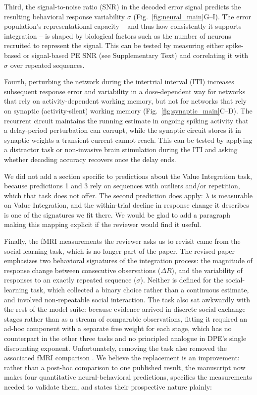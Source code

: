 \begin{ms}
Third, the signal-to-noise ratio (SNR) in the decoded error signal predicts the resulting behavioral response variability $\sigma$ (Fig.~\ref{fig:neural_main}G--I). The error population's representational capacity -- and thus how consistently it supports integration -- is shaped by biological factors such as the number of neurons recruited to represent the signal. This can be tested by measuring either spike-based or signal-based PE SNR (see Supplementary Text) and correlating it with $\sigma$ over repeated sequences.

Fourth, perturbing the network during the intertrial interval (ITI) increases subsequent response error and variability in a dose-dependent way for networks that rely on activity-dependent working memory, but not for networks that rely on synaptic (activity-silent) working memory (Fig.~\ref{fig:synaptic_main}C--D). The recurrent circuit maintains the running estimate in ongoing spiking activity that a delay-period perturbation can corrupt, while the synaptic circuit stores it in synaptic weights a transient current cannot reach. This can be tested by applying a distractor task or non-invasive brain stimulation during the ITI and asking whether decoding accuracy recovers once the delay ends.
\end{ms}

We did not add a section specific to predictions about the Value Integration task, because predictions 1 and 3 rely on sequences with outliers and/or repetition, which that task does not offer. The second prediction does apply: $\lambda$ is measurable on Value Integration, and the within-trial decline in response change it describes is one of the signatures we fit there. We would be glad to add a paragraph making this mapping explicit if the reviewer would find it useful.

Finally, the fMRI measurements the reviewer asks us to revisit came from the social-learning task, which is no longer part of the paper. The revised paper emphasizes two behavioral signatures of the integration process: the magnitude of response change between consecutive observations ($\Delta R$), and the variability of responses to an exactly repeated sequence ($\sigma$). Neither is defined for the social-learning task, which collected a binary choice rather than a continuous estimate, and involved non-repeatable social interaction. The task also sat awkwardly with the rest of the model suite: because evidence arrived in discrete social-exchange stages rather than as a stream of comparable observations, fitting it required an ad-hoc component with a separate free weight for each stage, which has no counterpart in the other three tasks and no principled analogue in DPE's single discounting exponent. Unfortunately, removing the task also removed the associated fMRI comparison \citep{jiang2023neurocomputational}. We believe the replacement is an improvement: rather than a post-hoc comparison to one published result, the manuscript now makes four quantitative neural-behavioral predictions, specifies the measurements needed to validate them, and states their prospective nature plainly:

